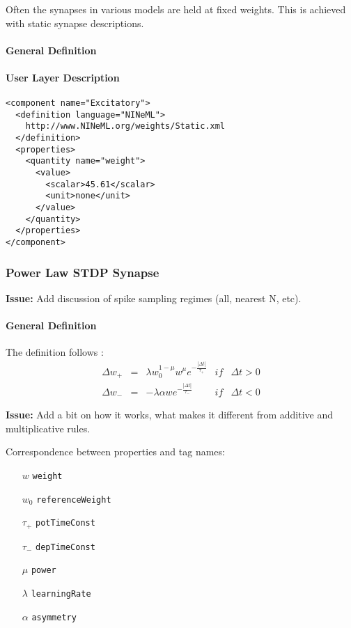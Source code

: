 \documentclass{article}
\newcommand{\issue}[1]{%
\begin{center}
\colorbox{issuecolor}{\parbox{0.8\linewidth}{\textbf{Issue:} #1}}
\end{center}%
}
\begin{document}
Often the synapses in various models are held at fixed weights. This
is achieved with static synapse descriptions.

\paragraph{General Definition}

\paragraph{User Layer Description}
\begin{verbatim}
<component name="Excitatory">
  <definition language="NINeML">
    http://www.NINeML.org/weights/Static.xml
  </definition>
  <properties>
    <quantity name="weight">
      <value>
        <scalar>45.61</scalar>
        <unit>none</unit>
      </value>
    </quantity>
  </properties>
</component>
\end{verbatim}

\subsubsection{Power Law STDP Synapse}

\issue {Add discussion of spike sampling regimes (all, nearest N, etc).}

\paragraph{General Definition}

The definition follows \cite{morrison-etal-07}:
\begin{equation}
\begin{array}{rclcl}
\Delta w_+&=&\lambda w_0^{1-\mu}w^{\mu}e^{-\frac{|\Delta t|}{\tau_+}} &if& \Delta t>0\\
\Delta w_-&=&-\lambda \alpha we^{-\frac{|\Delta t|}{\tau_-}} &if& \Delta t<0
\end{array}
\label{powerSTDP}
\end{equation}

\issue {Add a bit on how it works, what makes it different from
additive and multiplicative rules.}

Correspondence between properties and tag names:
\begin{itemize}
\item[$w$] {\tt weight}
\item[$w_0$] {\tt referenceWeight}
\item[$\tau_+$] {\tt potTimeConst}
\item[$\tau_-$] {\tt depTimeConst}
\item[$\mu$] {\tt power}
\item[$\lambda$] {\tt learningRate}
\item[$\alpha$] {\tt asymmetry}
\end{itemize}
\end{document}
